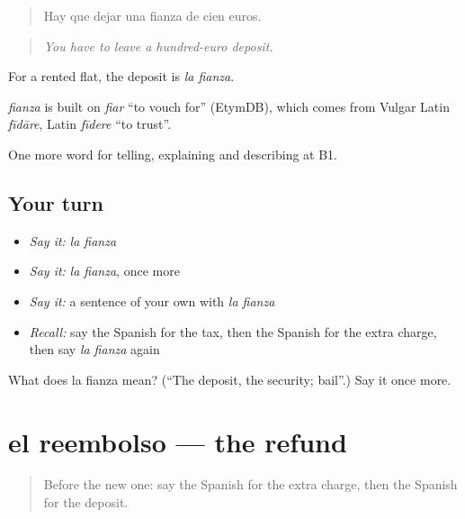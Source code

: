 \begin{quote}
Hay que dejar una fianza de cien euros.
\end{quote}

\begin{quote}
\emph{You have to leave a hundred-euro deposit.}
\end{quote}

For a rented flat, the deposit is \emph{la fianza}.

\begin{cousinweb}
\emph{fianza} is built on \emph{fiar} \textquotedblleft{}to vouch for\textquotedblright{} (EtymDB), which comes from Vulgar Latin \emph{fīdāre}, Latin \emph{fīdere} \textquotedblleft{}to trust\textquotedblright{}.
\end{cousinweb}

\begin{grammarlens}[title={What you've built}]
One more word for telling, explaining and describing at B1.
\end{grammarlens}

\subsection*{Your turn}
\begin{itemize}
\raggedright
  \item \emph{Say it:} \emph{la fianza}
  \item \emph{Say it:} \emph{la fianza}, once more
  \item \emph{Say it:} a sentence of your own with \emph{la fianza}
  \item \emph{Recall:} say the Spanish for the tax, then the Spanish for the extra charge, then say \emph{la fianza} again
\end{itemize}

\begin{tcolorbox}[breakable,colback=teal!4,colframe=teal!35!black,title={Before you move on}]
What does la fianza mean? (\textquotedblleft{}The deposit, the security; bail\textquotedblright{}.) Say it once more.
\end{tcolorbox}
\section[el reembolso]{el reembolso — the refund}

\label{lesson:ES-C663-reembolso}



\begin{quote}
Before the new one: say the Spanish for the extra charge, then the Spanish for the deposit.
\end{quote}

